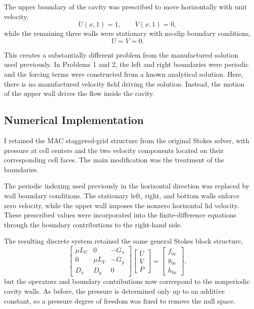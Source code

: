 \documentclass[12pt]{article}
\begin{document}
The upper boundary of the cavity was prescribed to move horizontally with
unit velocity,
\[
U(x,1)=1,
\qquad
V(x,1)=0,
\]
while the remaining three walls were stationary with no-slip boundary
conditions,
\[
U=V=0.
\]

This creates a substantially different problem from the manufactured
solution used previously. In Problems 1 and 2, the left and right boundaries
were periodic and the forcing terms were constructed from a known analytical
solution. Here, there is no manufactured velocity field driving the solution.
Instead, the motion of the upper wall drives the flow inside the cavity.

\subsection*{Numerical Implementation}

I retained the MAC staggered-grid structure from the original Stokes solver,
with pressure at cell centers and the two velocity components located on
their corresponding cell faces. The main modification was the treatment of
the boundaries.

The periodic indexing used previously in the horizontal direction was
replaced by wall boundary conditions. The stationary left, right, and bottom
walls enforce zero velocity, while the upper wall imposes the nonzero
horizontal lid velocity. These prescribed values were incorporated into the
finite-difference equations through the boundary contributions to the
right-hand side.

The resulting discrete system retained the same general Stokes block
structure,
\[
\begin{bmatrix}
\mu L_U & 0 & -G_x \\
0 & \mu L_V & -G_y \\
D_x & D_y & 0
\end{bmatrix}
\begin{bmatrix}
U \\ V \\ P
\end{bmatrix}
=
\begin{bmatrix}
f_{\mathrm{bc}} \\
g_{\mathrm{bc}} \\
h_{\mathrm{bc}}
\end{bmatrix},
\]
but the operators and boundary contributions now correspond to the
nonperiodic cavity walls. As before, the pressure is determined only up to
an additive constant, so a pressure degree of freedom was fixed to remove
the null space.
\end{document}
